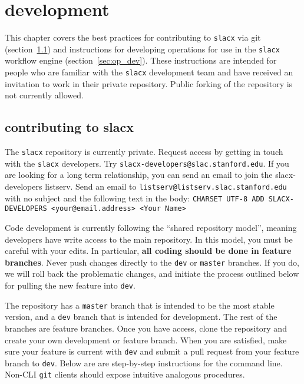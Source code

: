 \chapter{development}
\label{ch:dev}

This chapter covers the best practices 
for contributing to \verb|slacx| via git (section~\ref{sec:slacx_dev})
and instructions for developing operations
for use in the \verb|slacx| workflow engine (section~\ref{sec:op_dev}).
These instructions are intended for people
who are familiar with the \verb|slacx| development team
and have received an invitation to work in their private repository.
Public forking of the repository is not currently allowed.

\section{contributing to slacx}
\label{sec:slacx_dev}

The \verb|slacx| repository is currently private.
Request access by getting in touch with the \verb|slacx| developers.
Try \verb|slacx-developers@slac.stanford.edu|. 
If you are looking for a long term relationship,
you can send an email to join the slacx-developers listserv.
Send an email to \newline
\verb|listserv@listserv.slac.stanford.edu| \newline
with no subject and the following text in the body: \newline
\verb|CHARSET UTF-8 ADD SLACX-DEVELOPERS <your@email.address> <Your Name>|

Code development is currently following the ``shared repository model'',
meaning developers have write access to the main repository.
In this model, you must be careful with your edits.
In particular, \textbf{all coding should be done in feature branches}.
Never push changes directly to the \verb|dev| or \verb|master| branches.
If you do, we will roll back the problematic changes, 
and initiate the process outlined below for pulling the new feature into \verb|dev|.

The repository has a \verb|master| branch that is intended to be the most stable version,
and a \verb|dev| branch that is intended for development.
The rest of the branches are feature branches.
Once you have access, clone the repository
and create your own development or feature branch.
When you are satisfied, make sure your feature is current with \verb|dev|
and submit a pull request from your feature branch to \verb|dev|.
Below are are step-by-step instructions for the command line.
Non-CLI \verb|git| clients should expose intuitive analogous procedures.

